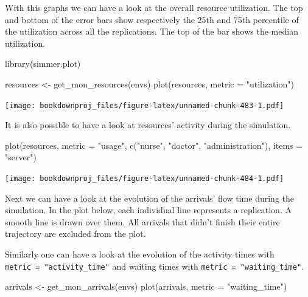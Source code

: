 \documentclass[
]{book}
\newenvironment{Shaded}{\begin{snugshade}}{\end{snugshade}}
\newcommand{\AttributeTok}[1]{\textcolor[rgb]{0.77,0.63,0.00}{#1}}
\newcommand{\FunctionTok}[1]{\textcolor[rgb]{0.00,0.00,0.00}{#1}}
\newcommand{\NormalTok}[1]{#1}
\newcommand{\OtherTok}[1]{\textcolor[rgb]{0.56,0.35,0.01}{#1}}
\newcommand{\StringTok}[1]{\textcolor[rgb]{0.31,0.60,0.02}{#1}}
\theoremstyle{definition}
\theoremstyle{definition}
\theoremstyle{definition}
\theoremstyle{definition}
\theoremstyle{remark}
\begin{document}
With this graphs we can have a look at the overall resource utilization. The top and bottom of the error bars show respectively the 25th and 75th percentile of the utilization across all the replications. The top of the bar shows the median utilization.

\begin{Shaded}
\begin{Highlighting}[]
\FunctionTok{library}\NormalTok{(simmer.plot)}

\NormalTok{resources }\OtherTok{\textless{}{-}} \FunctionTok{get\_mon\_resources}\NormalTok{(envs)}
\FunctionTok{plot}\NormalTok{(resources, }\AttributeTok{metric =} \StringTok{"utilization"}\NormalTok{)}
\end{Highlighting}
\end{Shaded}

\texttt{[image: bookdownproj\_files/figure-latex/unnamed-chunk-483-1.pdf]}

It is also possible to have a look at resources' activity during the simulation.

\begin{Shaded}
\begin{Highlighting}[]
\FunctionTok{plot}\NormalTok{(resources, }\AttributeTok{metric =} \StringTok{"usage"}\NormalTok{, }\FunctionTok{c}\NormalTok{(}\StringTok{"nurse"}\NormalTok{, }\StringTok{"doctor"}\NormalTok{, }\StringTok{"administration"}\NormalTok{), }\AttributeTok{items =} \StringTok{"server"}\NormalTok{)}
\end{Highlighting}
\end{Shaded}

\texttt{[image: bookdownproj\_files/figure-latex/unnamed-chunk-484-1.pdf]}

Next we can have a look at the evolution of the arrivals' flow time during the simulation. In the plot below, each individual line represents a replication. A smooth line is drawn over them. All arrivals that didn't finish their entire trajectory are excluded from the plot.

Similarly one can have a look at the evolution of the activity times with \texttt{metric\ =\ "activity\_time"} and waiting times with \texttt{metric\ =\ "waiting\_time"}.

\begin{Shaded}
\begin{Highlighting}[]
\NormalTok{arrivals }\OtherTok{\textless{}{-}} \FunctionTok{get\_mon\_arrivals}\NormalTok{(envs)}
\FunctionTok{plot}\NormalTok{(arrivals, }\AttributeTok{metric =} \StringTok{"waiting\_time"}\NormalTok{)}
\end{Highlighting}
\end{Shaded}
\end{document}
